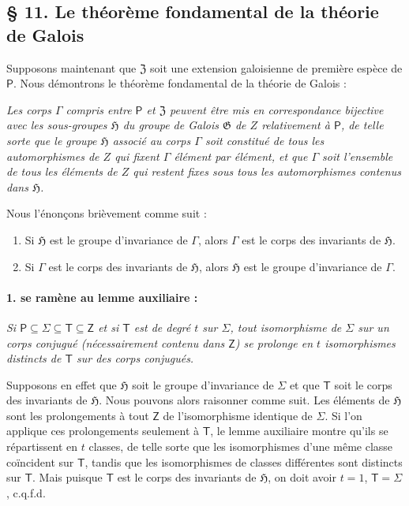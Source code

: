 \subsection*{\S{} 11. Le théorème fondamental de la théorie de Galois}\label{der-hauptsatz-der-galoisschen-theorie}

Supposons maintenant que \(\mathfrak Z\) soit une extension galoisienne de première espèce de \(\mathsf P\). Nous démontrons le théorème fondamental de la théorie de Galois :

\emph{Les corps \(\Gamma\) compris entre \(\mathsf P\) et \(\mathfrak Z\) peuvent être mis en correspondance bijective avec les sous-groupes \(\mathfrak H\) du groupe de Galois \(\mathfrak G\) de \(Z\) relativement à \(\mathsf P\), de telle sorte que le groupe \(\mathfrak H\) associé au corps \(\Gamma\) soit constitué de tous les automorphismes de \(Z\) qui fixent \(\Gamma\) élément par élément, et que \(\Gamma\) soit l'ensemble de tous les éléments de \(Z\) qui restent fixes sous tous les automorphismes contenus dans \(\mathfrak H\).}

Nous l'énonçons brièvement comme suit :

\begin{enumerate}
\item Si \(\mathfrak H\) est le groupe d'invariance de \(\Gamma\), alors \(\Gamma\) est le corps des invariants de \(\mathfrak H\).
\item Si \(\Gamma\) est le corps des invariants de \(\mathfrak H\), alors \(\mathfrak H\) est le groupe d'invariance de \(\Gamma\).
\end{enumerate}

\paragraph{1. se ramène au lemme auxiliaire :}\label{laesst-sich-zurueckfuehren-auf-den-hilfssatz}

\emph{Si \(\mathsf P \subseteq \Sigma \subseteq \mathsf T \subseteq \mathsf Z\) et si \(\mathsf T\) est de degré \(t\) sur \(\Sigma\), tout isomorphisme de \(\Sigma\) sur un corps conjugué (nécessairement contenu dans \(\mathsf Z\)) se prolonge en \(t\) isomorphismes distincts de \(\mathsf T\) sur des corps conjugués.}

Supposons en effet que \(\mathfrak H\) soit le groupe d'invariance de \(\Sigma\) et que \(\mathsf T\) soit le corps des invariants de \(\mathfrak H\). Nous pouvons alors raisonner comme suit. Les éléments de \(\mathfrak H\) sont les prolongements à tout \(\mathsf Z\) de l'isomorphisme identique de \(\Sigma\). Si l'on applique ces prolongements seulement à \(\mathsf T\), le lemme auxiliaire montre qu'ils se répartissent en \(t\) classes, de telle sorte que les isomorphismes d'une même classe coïncident sur \(\mathsf T\), tandis que les isomorphismes de classes différentes sont distincts sur \(\mathsf T\). Mais puisque \(\mathsf T\) est le corps des invariants de \(\mathfrak H\), on doit avoir \(t=1\), \(\mathsf T=\Sigma\), c.q.f.d.

